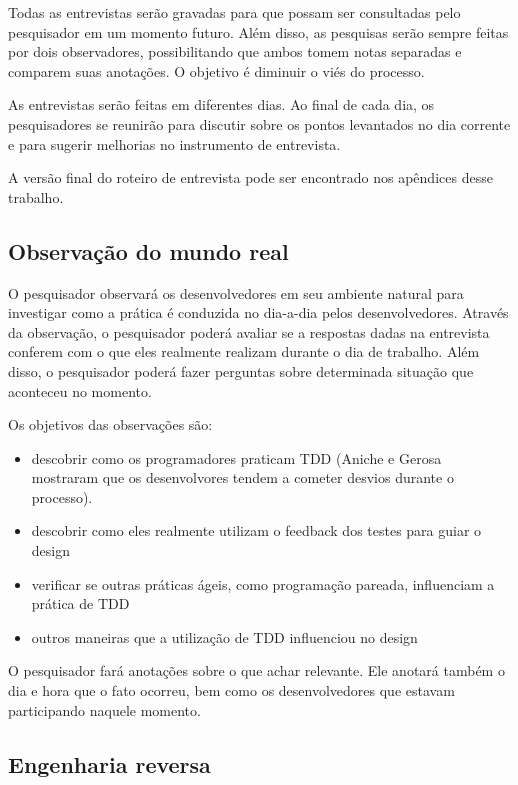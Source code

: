 Todas as entrevistas serão gravadas para que possam ser consultadas pelo pesquisador em um momento futuro. Além disso,
as pesquisas serão sempre feitas por dois observadores, possibilitando que ambos tomem notas separadas e comparem
suas anotações. O objetivo é diminuir o viés do processo.

As entrevistas serão feitas em diferentes dias. Ao final de cada dia, os pesquisadores se reunirão para discutir
sobre os pontos levantados no dia corrente e para sugerir melhorias no instrumento de entrevista. 

A versão final do roteiro de entrevista pode ser encontrado nos apêndices desse trabalho.

\subsection{Observação do mundo real}
\label{sec:planejamento-estrategia-observacao}

O pesquisador observará os desenvolvedores em seu ambiente natural para investigar como a 
prática é conduzida no dia-a-dia pelos desenvolvedores. Através da observação, o pesquisador poderá avaliar se
a respostas dadas na entrevista conferem com o que eles realmente realizam durante o dia de trabalho. Além disso, o pesquisador
poderá fazer perguntas sobre determinada situação que aconteceu no momento.

Os objetivos das observações são:

\begin{itemize}
	\item descobrir como os programadores praticam TDD (Aniche e Gerosa \cite{aniche-mistakes} mostraram que os desenvolvores tendem a cometer desvios durante o processo).
	\item descobrir como eles realmente utilizam o feedback dos testes para guiar o design
	\item verificar se outras práticas ágeis, como programação pareada, influenciam a prática de TDD
	\item outros maneiras que a utilização de TDD influenciou no design
\end{itemize}

O pesquisador fará anotações sobre o que achar relevante. Ele anotará também o dia e hora que o fato ocorreu, bem como os desenvolvedores
que estavam participando naquele momento.

\subsection{Engenharia reversa}
\label{sec:planejamento-estrategia-engenharia-reversa}

